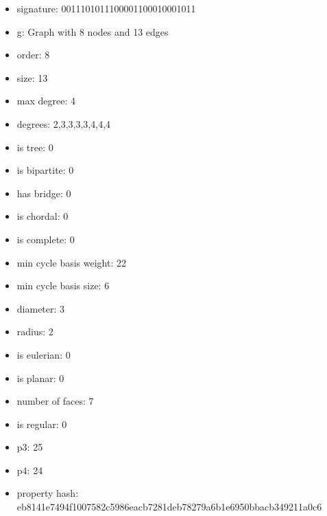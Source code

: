 \begin{itemize}
\item signature: 0011101011100001100010001011
\item g: Graph with 8 nodes and 13 edges
\item order: 8
\item size: 13
\item max degree: 4
\item degrees: 2,3,3,3,3,4,4,4
\item is tree: 0
\item is bipartite: 0
\item has bridge: 0
\item is chordal: 0
\item is complete: 0
\item min cycle basis weight: 22
\item min cycle basis size: 6
\item diameter: 3
\item radius: 2
\item is eulerian: 0
\item is planar: 0
\item number of faces: 7
\item is regular: 0
\item p3: 25
\item p4: 24
\item property hash: eb8141e7494f1007582c5986eacb7281deb78279a6b1e6950bbacb349211a0c6
\end{itemize}
\newpage
\begin{figure}
\end{figure}
